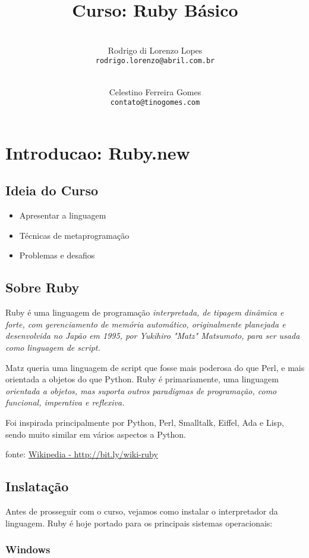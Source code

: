 \documentclass[serif,mathserif]{article}
\author{ 
    \\ Rodrigo di Lorenzo Lopes \\  \texttt{rodrigo.lorenzo@abril.com.br}
	\and 
    \\ Celestino Ferreira Gomes \\ \texttt{contato@tinogomes.com}
}
\title{Curso: Ruby Básico}
\begin{document}
\maketitle
 
\tableofcontents

\section{Introducao: Ruby.new}

\subsection{Ideia do Curso}

\begin{itemize}
  \item Apresentar a linguagem
  \item Técnicas de metaprogramação
  \item Problemas e desafios
\end{itemize}

\subsection{Sobre Ruby}
Ruby é uma linguagem de programação \em{interpretada}, de \em{tipagem dinâmica} e \em{forte}, com \em{gerenciamento de memória automático},
 originalmente planejada e desenvolvida no Japão em 1995, por Yukihiro "Matz" Matsumoto, para ser usada como linguagem de script.

Matz queria uma linguagem de script que fosse mais poderosa do que Perl, e mais orientada a objetos do que Python.
Ruby é primariamente, uma linguagem \em{orientada a objetos}, mas suporta outros paradigmas de programação,
como \em{funcional}, \em{imperativa}  e \em{reflexiva}.

Foi inspirada principalmente por Python, Perl, Smalltalk, Eiffel, Ada e Lisp, sendo muito similar em vários aspectos a Python.

fonte: \href{http://bit.ly/wiki-ruby}{Wikipedia - http://bit.ly/wiki-ruby}

\subsection{Inslatação}
Antes de prosseguir com o curso, vejamos como instalar o interpretador da linguagem. Ruby é hoje portado para os principais sistemas operacionais:

\subsubsection{Windows}
\end{document}
